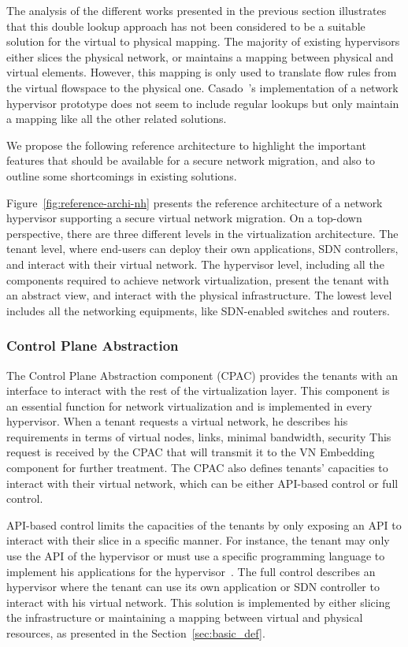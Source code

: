 The analysis of the different works presented in the previous section illustrates that this double lookup approach has not been considered to be a suitable solution for the virtual to physical mapping. The majority of existing hypervisors either slices the physical network, or maintains a mapping between physical and virtual elements. However, this mapping is only used to translate flow rules from the virtual flowspace to the physical one. Casado~\etal's  implementation of a network hypervisor prototype does not seem to include regular lookups but only maintain a mapping like all the other related solutions.

We propose the following reference architecture to highlight the important features that should be available for a secure network migration, and also to outline some shortcomings in existing solutions.


  
Figure~\ref{fig:reference-archi-nh} presents the reference architecture of a network hypervisor supporting a secure virtual network migration.
On a top-down perspective, there are three different levels in the virtualization architecture.
The tenant level, where end-users can deploy their own applications, SDN controllers, and interact with their virtual network.
The hypervisor level, including all the components required to achieve network virtualization, present the tenant with an abstract view, and interact with the physical infrastructure.
The lowest level includes all the networking equipments, like SDN-enabled switches and routers.

\subsubsection{Control Plane Abstraction}
The Control Plane Abstraction component (CPAC) provides the tenants with an interface to interact with the rest of the virtualization layer.
This component is an essential function for network virtualization and is implemented in every hypervisor.
When a tenant requests a virtual network, he describes his requirements in terms of virtual nodes, links, minimal bandwidth, security \etc This request is received by the CPAC that will transmit it to the VN Embedding component for further treatment.
The CPAC also defines tenants' capacities to interact with their virtual network, which can be either API-based control or full control.

API-based control limits the capacities of the tenants by only exposing an API to interact with their slice in a specific manner. For instance, the tenant may only use the API of the hypervisor or must use a specific programming language to implement his applications for the hypervisor~\cite{CompositionalHypervisor-Jin2014,NetworkHypervisor-Huang2013}. 
The full control describes an hypervisor where the tenant can use its own application or SDN controller to interact with his virtual network. This solution is implemented by either slicing the infrastructure or maintaining a mapping between virtual and physical resources, as presented in the Section~\ref{sec:basic_def}.



